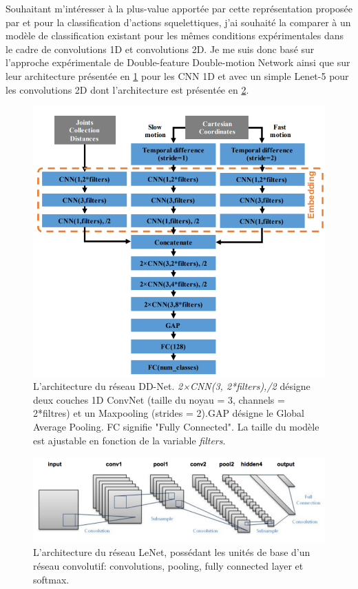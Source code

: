 Souhaitant m'intéresser à la plus-value apportée par cette représentation proposée par \cite{liu2016spatio} et \cite{2018arXiv180110304Y} pour la classification d'actions squelettiques, j'ai souhaité la comparer à un modèle de classification existant pour les mêmes conditions expérimentales dans le cadre de convolutions 1D et convolutions 2D. Je me suis donc basé sur l'approche expérimentale de Double-feature Double-motion Network \cite{2019arXiv190709658Y} ainsi que sur leur architecture présentée en \ref{fig:DDnet} pour les CNN 1D et avec un simple Lenet-5 \cite{lecun1998gradient} pour les convolutions 2D dont l'architecture est présentée en \ref{fig:Lenet}.


\begin{figure}[H]
    \centering
    \includegraphics[width=0.55\linewidth]{Images/ddnet.png}
    \caption{L'architecture du réseau DD-Net. \textit{2×CNN(3,
2*filters),/2} désigne deux couches 1D ConvNet (taille du noyau
= 3, channels = 2*filtres) et un Maxpooling (strides = 2).GAP
désigne le Global Average Pooling. FC signifie "Fully Connected". La taille du modèle est ajustable en fonction de la variable \textit{filters}.}
    \label{fig:DDnet}
\end{figure}

\begin{figure}[H]
    \centering
    \includegraphics[width=0.85\linewidth]{Images/lenet_architecture.png}
    \caption{L'architecture du réseau LeNet, possédant les unités de base d'un réseau convolutif: convolutions, pooling, fully connected layer et softmax.}
    \label{fig:Lenet}
\end{figure}

